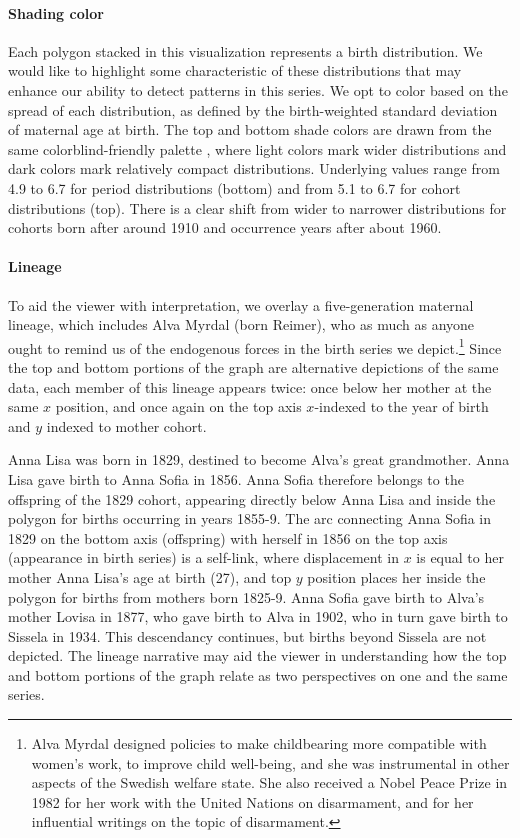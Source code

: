 \paragraph{Shading color}
Each polygon stacked in this visualization represents a birth distribution. We would like to highlight some characteristic of these distributions that may enhance our ability to detect patterns in this series. We opt to color based on the spread of each distribution, as defined by the birth-weighted standard deviation of maternal age at birth. The top and bottom shade colors are drawn from the same colorblind-friendly palette \citep{viridis}, where light colors mark wider distributions and dark colors mark relatively compact distributions. Underlying values range from 4.9 to 6.7 for period distributions (bottom) and from 5.1 to 6.7 for cohort distributions (top). There is a clear shift from wider to narrower distributions for cohorts born after around 1910 and occurrence years after about 1960.

\paragraph{Lineage}
To aid the viewer with interpretation, we overlay a five-generation maternal lineage, which includes Alva Myrdal (born Reimer), who as much as anyone ought to remind us of the endogenous forces in the birth series we depict.\footnote{Alva Myrdal designed policies to make childbearing more compatible with women's work, to improve child well-being, and she was instrumental in other aspects of the Swedish welfare state. She also received a Nobel Peace Prize in 1982 for her work with the United Nations on disarmament, and for her influential writings on the topic of disarmament.} Since the top and bottom portions of the graph are alternative depictions of the same data, each member of this lineage appears twice: once below her mother at the same $x$ position, and once again on the top axis $x$-indexed to the year of birth and $y$ indexed to mother cohort. 

Anna Lisa was born in 1829, destined to become Alva's great grandmother. Anna Lisa gave birth to Anna Sofia in 1856. Anna Sofia therefore belongs to the offspring of the 1829 cohort, appearing directly below Anna Lisa and inside the polygon for births occurring in years 1855-9. The arc connecting Anna Sofia in 1829 on the bottom axis (offspring) with herself in 1856 on the top axis (appearance in birth series) is a self-link, where displacement in $x$ is equal to her mother Anna Lisa's age at birth (27), and top $y$ position places her inside the polygon for births from mothers born 1825-9. Anna Sofia gave birth to Alva's mother Lovisa in 1877, who gave birth to Alva in 1902, who in turn gave birth to Sissela in 1934. This descendancy continues, but births beyond Sissela are not depicted. The lineage narrative may aid the viewer in understanding how the top and bottom portions of the graph relate as two perspectives on one and the same series. 

